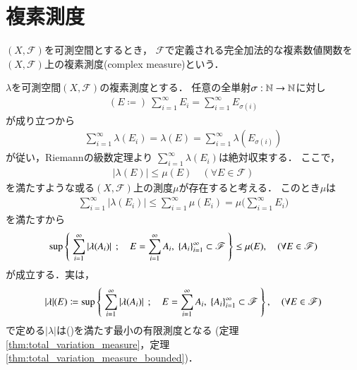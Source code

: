 \section{複素測度}
	\begin{screen}
		\begin{dfn}[複素測度]
			$(X,\mathscr{F})$を可測空間とするとき，
			$\mathscr{F}$で定義される完全加法的な複素数値関数を
			$(X,\mathscr{F})$上の複素測度(complex measure)という．
		\end{dfn}
	\end{screen}
	
	$\lambda$を可測空間$(X,\mathscr{F})$の複素測度とする．
	任意の全単射$\sigma:\mathbb{N} \rightarrow \mathbb{N}$に対し
	\begin{align}
		(E \coloneqq)\ \sum_{i=1}^{\infty}E_i = \sum_{i=1}^{\infty}E_{\sigma(i)}
	\end{align}
	が成り立つから
	\begin{align}
		\sum_{i=1}^{\infty} \lambda(E_i) = \lambda(E) = \sum_{i=1}^{\infty} \lambda(E_{\sigma(i)})
	\end{align}
	が従い，Riemannの級数定理より
	$\sum_{i=1}^{\infty} \lambda(E_i)$は絶対収束する．
	ここで，
	\begin{align}
		|\lambda(E)| \leq \mu(E) \quad (\forall E \in \mathscr{F})
		\label{radon_nikodym_1}
	\end{align}
	を満たすような或る$(X,\mathscr{F})$上の測度$\mu$が存在すると考える．
	このとき$\mu$は
	\begin{align}
		\sum_{i=1}^{\infty} |\lambda(E_i)| \leq \sum_{i=1}^{\infty} \mu(E_i) 
		= \mu\Biggl(\sum_{i=1}^{\infty} E_i\Biggr)
	\end{align}
	を満たすから
	\begin{align}
		\operatorname*{sup}_{} \left\{\ \sum_{i=1}^{\infty} |\lambda(A_i)|\ \, ; \quad E = \sum_{i=1}^\infty A_i,\ \{A_i\}_{i=1}^\infty \subset \mathscr{F}\ \right\} 
		\leq \mu(E),
		\quad (\forall E \in \mathscr{F})
		\label{radon_nikodym_2}
	\end{align}
	が成立する．実は，
	\begin{align}
		|\lambda|(E) \coloneqq 
		\operatorname*{sup}_{} \left\{\ \sum_{i=1}^{\infty} |\lambda(A_i)|\ \, ; \quad E = \sum_{i=1}^\infty A_i,\ \{A_i\}_{i=1}^\infty \subset \mathscr{F}\ \right\},
		\quad (\forall E \in \mathscr{F})
		\label{radon_nikodym_3}
	\end{align}
	で定める$|\lambda|$は()を満たす最小の有限測度となる
	(定理\ref{thm:total_variation_measure}，定理\ref{thm:total_variation_measure_bounded})．
	
